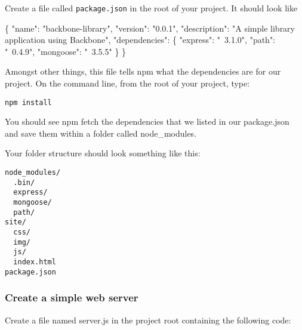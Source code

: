 \documentclass[9pt]{book}
\newenvironment{Shaded}{}{}
\newcommand{\StringTok}[1]{\textcolor[rgb]{0.25,0.44,0.63}{{#1}}}
\newcommand{\NormalTok}[1]{{#1}}
\begin{document}
Create a file called \texttt{package.json} in the root of your project.
It should look like

\begin{Shaded}
\begin{Highlighting}[]
\NormalTok{\{}
    \StringTok{"name"}\NormalTok{: }\StringTok{"backbone-library"}\NormalTok{,}
    \StringTok{"version"}\NormalTok{: }\StringTok{"0.0.1"}\NormalTok{,}
    \StringTok{"description"}\NormalTok{: }\StringTok{"A simple library application using Backbone"}\NormalTok{,}
    \StringTok{"dependencies"}\NormalTok{: \{}
        \StringTok{"express"}\NormalTok{: }\StringTok{"~3.1.0"}\NormalTok{,}
        \StringTok{"path"}\NormalTok{: }\StringTok{"~0.4.9"}\NormalTok{,}
        \StringTok{"mongoose"}\NormalTok{: }\StringTok{"~3.5.5"}
    \NormalTok{\}}
\NormalTok{\}}
\end{Highlighting}
\end{Shaded}

Amongst other things, this file tells npm what the dependencies are for
our project. On the command line, from the root of your project, type:

\begin{verbatim}
npm install
\end{verbatim}

You should see npm fetch the dependencies that we listed in our
package.json and save them within a folder called node\_modules.

Your folder structure should look something like this:

\begin{verbatim}
node_modules/
  .bin/
  express/
  mongoose/
  path/
site/
  css/
  img/
  js/
  index.html
package.json
\end{verbatim}

\subsubsection{Create a simple web
server}\label{create-a-simple-web-server}

Create a file named server.js in the project root containing the
following code:
\end{document}
